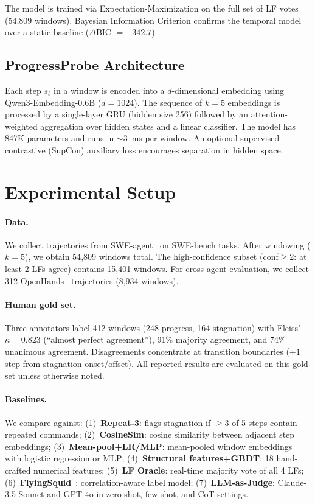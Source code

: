 \documentclass[11pt,a4paper]{article}
\begin{document}
The model is trained via Expectation-Maximization on the full set of LF votes (54{,}809 windows). Bayesian Information Criterion confirms the temporal model over a static baseline ($\Delta$BIC $= -342.7$).

\subsection{ProgressProbe Architecture}
\label{sec:probe}

Each step $s_t$ in a window is encoded into a $d$-dimensional embedding using Qwen3-Embedding-0.6B ($d{=}1024$). The sequence of $k{=}5$ embeddings is processed by a single-layer GRU (hidden size 256) followed by an attention-weighted aggregation over hidden states and a linear classifier. The model has 847K parameters and runs in ${\sim}3$~ms per window. An optional supervised contrastive (SupCon) auxiliary loss encourages separation in hidden space.

\section{Experimental Setup}
\label{sec:setup}

\paragraph{Data.} We collect trajectories from SWE-agent~\cite{yang2024sweagent} on SWE-bench tasks. After windowing ($k{=}5$), we obtain 54{,}809 windows total. The high-confidence subset (conf$\geq$2: at least 2 LFs agree) contains 15{,}401 windows. For cross-agent evaluation, we collect 312 OpenHands~\cite{wang2024opendevin} trajectories (8{,}934 windows).

\paragraph{Human gold set.} Three annotators label 412 windows (248 progress, 164 stagnation) with Fleiss' $\kappa = 0.823$ (``almost perfect agreement''), 91\% majority agreement, and 74\% unanimous agreement. Disagreements concentrate at transition boundaries ($\pm 1$ step from stagnation onset/offset). All reported results are evaluated on this gold set unless otherwise noted.

\paragraph{Baselines.} We compare against: (1)~\textbf{Repeat-3}: flags stagnation if $\geq 3$ of 5 steps contain repeated commands; (2)~\textbf{CosineSim}: cosine similarity between adjacent step embeddings; (3)~\textbf{Mean-pool+LR/MLP}: mean-pooled window embeddings with logistic regression or MLP; (4)~\textbf{Structural features+GBDT}: 18 hand-crafted numerical features; (5)~\textbf{LF Oracle}: real-time majority vote of all 4 LFs; (6)~\textbf{FlyingSquid}~\cite{fu2020fast}: correlation-aware label model; (7)~\textbf{LLM-as-Judge}: Claude-3.5-Sonnet and GPT-4o in zero-shot, few-shot, and CoT settings.
\end{document}
